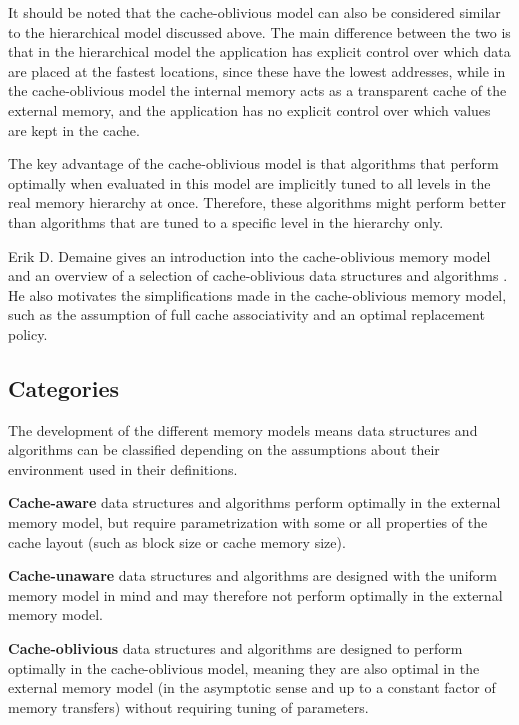 \documentclass{acm_proc_article-sp}
\begin{document}
It should be noted that the cache-oblivious model can also be considered similar to the hierarchical model discussed above. The main difference between the two is that in the hierarchical model the application has explicit control over which data are placed at the fastest locations, since these have the lowest addresses, while in the cache-oblivious model the internal memory acts as a transparent cache of the external memory, and the application has no explicit control over which values are kept in the cache.

The key advantage of the cache-oblivious model is that algorithms that perform optimally when evaluated in this model are implicitly tuned to all levels in the real memory hierarchy at once. Therefore, these algorithms might perform better than algorithms that are tuned to a specific level in the hierarchy only.

Erik D. Demaine gives an introduction into the cache-oblivious memory model and an overview of a selection of cache-oblivious data structures and algorithms \cite{demaine2002coa}. He also motivates the simplifications made in the cache-oblivious memory model, such as the assumption of full cache associativity and an optimal replacement policy.

\subsection{Categories}
The development of the different memory models means data structures and algorithms can be classified depending on the assumptions about their environment used in their definitions.
\begin{list}{}{}
\item \textbf{Cache-aware} data structures and algorithms perform optimally in the external memory model, but require parametrization with some or all properties of the cache layout (such as block size or cache memory size).
\item \textbf{Cache-unaware} data structures and algorithms are designed with the uniform memory model in mind and may therefore not perform optimally in the external memory model.
\item \textbf{Cache-oblivious} data structures and algorithms are designed to perform optimally in the cache-oblivious model, meaning they are also optimal in the external memory model (in the asymptotic sense and up to a constant factor of memory transfers) without requiring tuning of parameters.
\end{list}
\end{document}

